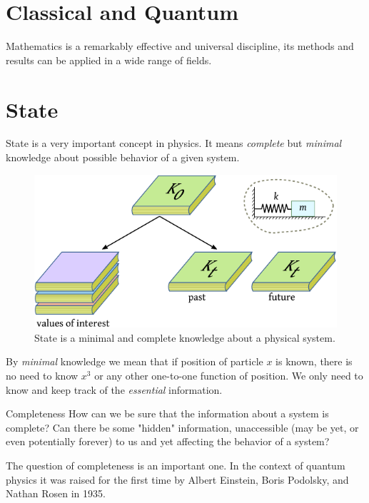 \section{Classical and Quantum}
Mathematics is a remarkably effective and universal discipline, its
methods and
results can be applied in a wide range of fields.

\section{State}
State is a very important concept in physics. It means \emph{complete} but \emph{minimal} knowledge about  possible behavior of a given system.
\begin{figure}[htbp]
	\centering
	\includegraphics[scale=1.0]{stateAsKnowledge}
	\caption{State is a minimal and complete knowledge about a physical system.}
	\label{fig:stateAsKnowledge}
\end{figure}
By \emph{minimal} knowledge we mean that if position of particle $x$ is known, there is no need to know $x^3$ or any other one-to-one function of position. We only need to know and keep track of the \emph{essential} information.

\begin{mybio}{Completeness}
	How can we be sure that the information about a system is complete? Can there be some "hidden" information, unaccessible (may be yet, or even potentially forever) to us and yet affecting the behavior of a system?
	
	The question of completeness is an important one. In the context of quantum physics it was raised for the first time by Albert Einstein, Boris Podolsky, and Nathan Rosen in 1935.
\end{mybio}

